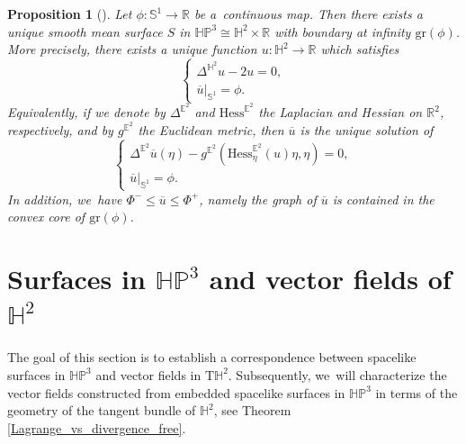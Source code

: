 \documentclass[10pt]{amsart}
\theoremstyle{plain}
\newtheorem{prop}[cor]{Proposition}
\theoremstyle{definition}
\newcommand{\HP}{\mathbb{HP}^3}
\begin{document}
\begin{prop}[{\cite[p.\,668, Prop.\,16.2.37, Lem.\,6.2.42]{barbotfillastre}}]\label{BF_platau_HP}
Let $\phi:\mathbb{S}^1\to\mathbb{R}$ be a~continuous map. Then there exists a unique smooth mean surface $S$ in $\HP\cong\mathbb{H}^2\times\mathbb{R}$ with boundary at infinity $\mathrm{gr}(\phi)$. More precisely, there exists a unique function $u:\mathbb{H}^2\to\mathbb{R}$ which satisfies
\begin{equation}\label{platau_HP}
\begin{cases}
\Delta^{\mathbb{H}^2} u-2u=0, \\
\overline{u}|_{\mathbb{S}^1}=\phi.
\end{cases}\end{equation}
Equivalently, if we denote by \(\Delta^{\mathbb{E}^2}\) and \(\mathrm{Hess}^{\mathbb{E}^2}\) the Laplacian and Hessian on \(\mathbb{R}^2\), respectively, and by \(g^{\mathbb{E}^2}\) the Euclidean metric, then \(\overline{u}\) is the unique solution of \begin{equation}\label{platau_HPE}
\begin{cases}
\Delta^{\mathbb{E}^2}\overline{u}(\eta)-g^{\mathbb{E}^2}(\mathrm{Hess}_{\eta}^{\mathbb{E}^2}(u)\eta,\eta)=0, \\
\overline{u}|_{\mathbb{S}^1}=\phi.
\end{cases}\end{equation}
In addition, we~have $\Phi^-\leq\overline{u}\leq \Phi^+$, namely the graph of $\overline{u}$ is contained in the convex core of $\mathrm{gr}(\phi)$.
\end{prop}

\section{Surfaces in \texorpdfstring{$\HP$}{HP} and vector fields of \texorpdfstring{$\mathbb{H}^2$}{H2}}
\label{sec4_correpondance}
The goal of this section is to establish a correspondence between spacelike surfaces in $\HP$ and vector fields in $\mathrm{T}\mathbb{H}^2$. Subsequently, we~will characterize the vector fields constructed from embedded spacelike surfaces in $\HP$ in terms of the geometry of the tangent bundle of $\mathbb{H}^2$, see Theorem \ref{Lagrange_vs_divergence_free}.
\end{document}
